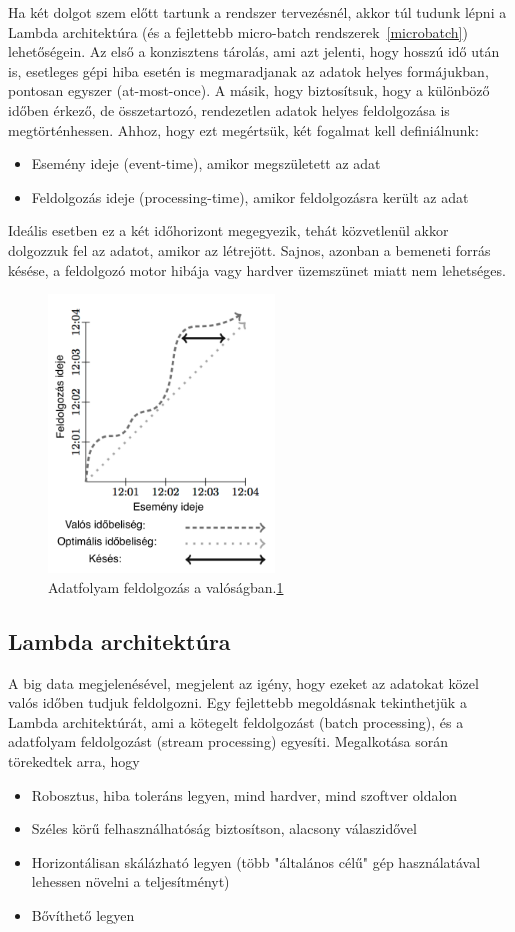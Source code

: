 \documentclass[a4paper,12pt]{article}
\begin{document}
Ha két dolgot szem előtt tartunk a rendszer tervezésnél, akkor túl tudunk lépni a Lambda architektúra (és a fejlettebb micro-batch rendszerek~\ref{microbatch}) lehetőségein. Az első a konzisztens tárolás, ami azt jelenti, hogy hosszú idő után is, esetleges gépi hiba esetén is megmaradjanak az adatok helyes formájukban, pontosan egyszer (at-most-once). A másik, hogy biztosítsuk, hogy a különböző időben érkező, de összetartozó, rendezetlen adatok helyes feldolgozása is megtörténhessen. Ahhoz, hogy ezt megértsük, két fogalmat kell definiálnunk:
\begin{itemize}
\item Esemény ideje (event-time), amikor megszületett az adat
\item Feldolgozás ideje (processing-time), amikor feldolgozásra került az adat
\end{itemize}
Ideális esetben ez a két időhorizont megegyezik, tehát közvetlenül akkor dolgozzuk fel az adatot, amikor az létrejött. Sajnos, azonban a bemeneti forrás késése, a feldolgozó motor hibája vagy hardver üzemszünet miatt nem lehetséges. 
 
\begin{figure}[ht!]
\centering
\includegraphics[width=60mm]{img/skew.png}
\caption{Adatfolyam feldolgozás a valóságban.\ref{skew} \label{skew}} 
\end{figure}

\subsection{Lambda architektúra}
A big data megjelenésével, megjelent az igény, hogy ezeket az adatokat közel valós időben tudjuk feldolgozni. Egy fejlettebb megoldásnak tekinthetjük a Lambda architektúrát, ami a kötegelt feldolgozást (batch processing), és a adatfolyam feldolgozást (stream processing) egyesíti. Megalkotása során törekedtek arra, hogy 
\begin{itemize}
\item Robosztus, hiba toleráns legyen, mind hardver, mind szoftver oldalon
\item Széles körű felhasználhatóság biztosítson, alacsony válaszidővel
\item Horizontálisan skálázható legyen (több "általános célű" gép használatával lehessen növelni a teljesítményt)
\item Bővíthető legyen
\end{itemize}
\end{document}
